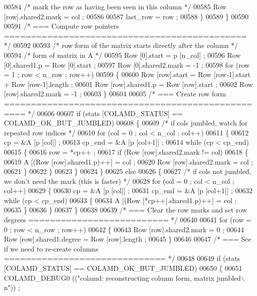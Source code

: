 \begin{DoxyCode}
{{{{{{{{{{00584       \textcolor{comment}{/* mark the row as having been seen in this column */}
00585       Row [row].shared2.mark = col ;
00586 
00587       last\_row = row ;
00588     \}
00589   \}
00590 
00591   \textcolor{comment}{/* === Compute row pointers ============================================= */}
00592 
00593   \textcolor{comment}{/* row form of the matrix starts directly after the column */}
00594   \textcolor{comment}{/* form of matrix in A */}
00595   Row [0].start = p [n\_col] ;
00596   Row [0].shared1.p = Row [0].start ;
00597   Row [0].shared2.mark = -1 ;
00598   \textcolor{keywordflow}{for} (row = 1 ; row < n\_row ; row++)
00599   \{
00600     Row [row].start = Row [row-1].start + Row [row-1].length ;
00601     Row [row].shared1.p = Row [row].start ;
00602     Row [row].shared2.mark = -1 ;
00603   \}
00604 
00605   \textcolor{comment}{/* === Create row form ================================================== */}
00606 
00607   \textcolor{keywordflow}{if} (stats [COLAMD\_STATUS] == COLAMD\_OK\_BUT\_JUMBLED)
00608   \{
00609     \textcolor{comment}{/* if cols jumbled, watch for repeated row indices */}
00610     \textcolor{keywordflow}{for} (col = 0 ; col < n\_col ; col++)
00611     \{
00612       cp = &A [p [col]] ;
00613       cp\_end = &A [p [col+1]] ;
00614       \textcolor{keywordflow}{while} (cp < cp\_end)
00615       \{
00616     row = *cp++ ;
00617     \textcolor{keywordflow}{if} (Row [row].shared2.mark != col)
00618     \{
00619       A [(Row [row].shared1.p)++] = col ;
00620       Row [row].shared2.mark = col ;
00621     \}
00622       \}
00623     \}
00624   \}
00625   \textcolor{keywordflow}{else}
00626   \{
00627     \textcolor{comment}{/* if cols not jumbled, we don't need the mark (this is faster) */}
00628     \textcolor{keywordflow}{for} (col = 0 ; col < n\_col ; col++)
00629     \{
00630       cp = &A [p [col]] ;
00631       cp\_end = &A [p [col+1]] ;
00632       \textcolor{keywordflow}{while} (cp < cp\_end)
00633       \{
00634     A [(Row [*cp++].shared1.p)++] = col ;
00635       \}
00636     \}
00637   \}
00638 
00639   \textcolor{comment}{/* === Clear the row marks and set row degrees ========================== */}
00640 
00641   \textcolor{keywordflow}{for} (row = 0 ; row < n\_row ; row++)
00642   \{
00643     Row [row].shared2.mark = 0 ;
00644     Row [row].shared1.degree = Row [row].length ;
00645   \}
00646 
00647   \textcolor{comment}{/* === See if we need to re-create columns ============================== */}
00648 
00649   \textcolor{keywordflow}{if} (stats [COLAMD\_STATUS] == COLAMD\_OK\_BUT\_JUMBLED)
00650   \{
00651     COLAMD\_DEBUG0 ((\textcolor{stringliteral}{"colamd: reconstructing column form, matrix jumbled\(\backslash\)n"})) ;
}}}}}}}}}}
\end{DoxyCode}
